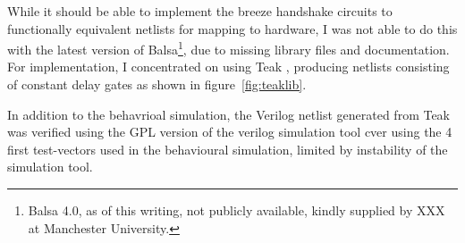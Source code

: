 While it should be able to implement the breeze handshake circuits to
functionally equivalent netlists for mapping to hardware, I was not
able to do this with the latest version of Balsa\footnote{Balsa 4.0,
  as of this writing, not publicly available, kindly supplied by XXX
  at Manchester University.}, due to missing library files and
documentation. For implementation, I concentrated on using Teak
\cite{teak}, producing netlists consisting of constant delay gates as
shown in figure~\ref{fig:teaklib}.

In addition to the behavrioal simulation, the Verilog netlist
generated from Teak was verified using the GPL version of the verilog
simulation tool cver using the 4 first test-vectors used in the
behavioural simulation, limited by instability of the simulation tool.
